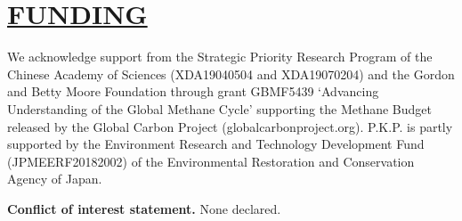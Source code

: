 \documentclass[a4paper,12pt]{article}
\begin{document}
{\section*{\textbf{\textsc{\Large{\underline{FUNDING}}}}}

\small{We acknowledge support from the Strategic Priority Research Program of the Chinese Academy of Sciences (XDA19040504 and XDA19070204) and the Gordon and Betty Moore Foundation through grant GBMF5439 ‘Advancing Understanding of the Global Methane Cycle’ supporting the Methane Budget released by the Global Carbon Project (globalcarbonproject.org). P.K.P. is partly supported by the Environment Research and Technology Development Fund (JPMEERF20182002) of the Environmental Restoration and Conservation Agency of Japan.}

\textbf{Conflict of interest statement.} \small{None declared.}

}
\end{document}
